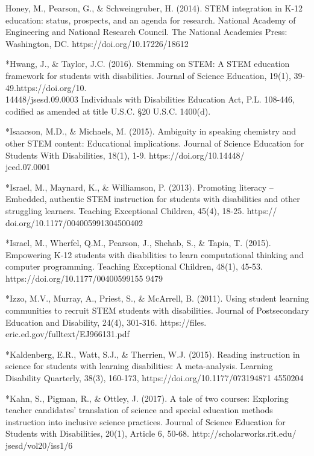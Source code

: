 \documentclass[11pt]{sig-alternate}
\begin{document}
\begin{large}
Honey, M., Pearson, G., \& Schweingruber, H. (2014). STEM integration in K-12 education: status, prospects, and an agenda for research. National Academy of Engineering and National Research Council. The National Academies Press: Washington, DC.
	https://doi.org/10.17226/18612

*Hwang, J., \& Taylor, J.C. (2016). Stemming on STEM: A STEM education framework for students with disabilities. Journal of Science Education, 19(1), 39-49.https://doi.org/10.\\14448/jsesd.09.0003
Individuals with Disabilities Education Act, P.L. 108-446, codified as amended at title U.S.C. §20 U.S.C. 1400(d).  

*Isaacson, M.D., \& Michaels, M. (2015). Ambiguity in speaking chemistry and other STEM content: Educational implications. Journal of Science Education for Students With Disabilities, 18(1), 1-9. https://doi.org/10.14448/\\jced.07.0001

*Israel, M., Maynard, K., \& Williamson, P. (2013). Promoting literacy – Embedded, authentic STEM instruction for students with disabilities and other struggling learners. Teaching Exceptional Children, 45(4), 18-25. https://\\doi.org/10.1177/004005991304500402

*Israel, M., Wherfel, Q.M., Pearson, J., Shehab, S., \& Tapia, T. (2015). Empowering K-12 students with disabilities to learn computational thinking and computer programming. Teaching Exceptional Children, 48(1), 45-53. https://doi.org/10.1177/00400599155 9479

*Izzo, M.V., Murray, A., Priest, S., \& McArrell, B. (2011). Using student learning communities to recruit STEM students with disabilities. Journal of Postsecondary Education and Disability, 24(4), 301-316. https://files. eric.ed.gov/fulltext/EJ966131.pdf

*Kaldenberg, E.R., Watt, S.J., \& Therrien, W.J. (2015). Reading instruction in science for students with learning disabilities: A meta-analysis. Learning Disability Quarterly, 38(3), 
	160-173, https://doi.org/10.1177/073194871 4550204

*Kahn, S., Pigman, R., \& Ottley, J. (2017). A tale of two courses: Exploring teacher candidates’ translation of science and special education methods instruction into inclusive science practices. Journal of Science Education for Students with Disabilities, 20(1), Article 6, 50-68. http://scholarworks.rit.edu/ jsesd/vol20/iss1/6


\end{large}
\end{document}
